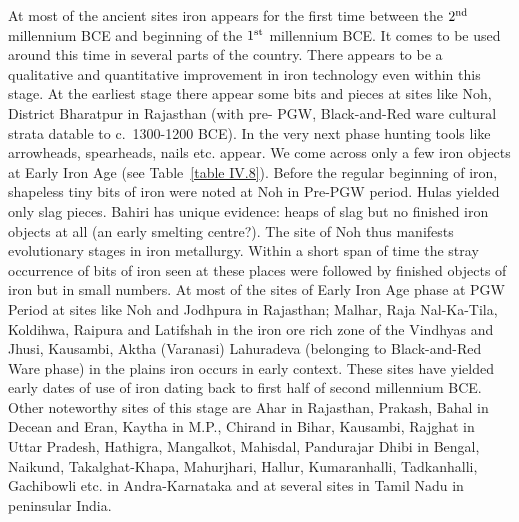 At most of the ancient sites iron appears for the first time between the $2^{\rm nd}$ millennium BCE and beginning of the $1^{\rm st}$ millennium BCE. It comes to be used around this time in several parts of the country. There appears to be a qualitative and quantitative improvement in iron technology even within this stage. At the earliest stage there appear some bits and pieces at sites like Noh, District Bharatpur in Rajasthan (with pre- PGW, Black-and-Red ware cultural strata datable to c.~1300-1200 BCE). In the very next phase hunting tools like arrowheads, spearheads, nails etc. appear. We come across only a few iron objects at Early Iron Age (see Table~\ref{table IV.8}). Before the regular beginning of iron, shapeless tiny bits of iron were noted at Noh in Pre-PGW period. Hulas yielded only slag pieces. Bahiri has unique evidence: heaps of slag but no finished iron objects at all (an early smelting centre?). The site of Noh thus manifests evolutionary stages in iron metallurgy. Within a short span of time the stray occurrence of bits of iron seen at these places were followed by finished objects of iron but in small numbers. At most of the sites of Early Iron Age phase at PGW Period at sites like Noh and Jodhpura in Rajasthan; Malhar, Raja Nal-Ka-Tila, Koldihwa, Raipura and Latifshah in the iron ore rich zone of the Vindhyas and Jhusi, Kausambi, Aktha (Varanasi) Lahuradeva (belonging to Black-and-Red Ware phase) in the plains iron occurs in early context. These sites have yielded early dates of use of iron dating back to first half of second millennium BCE. Other noteworthy sites of this stage are Ahar in Rajasthan, Prakash, Bahal in Decean and Eran, Kaytha in M.P., Chirand in Bihar, Kausambi, Rajghat in Uttar Pradesh, Hathigra, Mangalkot, Mahisdal, Pandurajar Dhibi in Bengal, Naikund, Takalghat-Khapa, Mahurjhari, Hallur, Kumaranhalli, Tadkanhalli, Gachibowli etc. in  Andra-Karnataka and at several sites in Tamil Nadu in peninsular India. 


